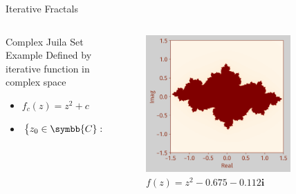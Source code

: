 \documentclass[aspectratio=169,t]{beamer}
\DeclarePairedDelimiter\abs{\lvert}{\rvert} %
\begin{document}
\begin{frame}[label={sec:orgbb74000}]{Iterative Fractals}
\begin{columns}
\begin{column}{0.55\columnwidth}
\begin{block}{Complex Juila Set Example}
Defined by iterative function in complex space

\begin{itemize}
\item \(f_c (z) = z^2 + c\)

\item \(\left\{ z_0 \in \symbb{C}: \abs{f^k_c \left(z_0 \right)} \in \symbb{C} \text{ as } k \to \infty\right\} \in K_c\)
\end{itemize}
\end{block}
\end{column}

\begin{column}{0.45\columnwidth}
\begin{figure}[htbp]
\centering
\includegraphics[width=0.80\textwidth]{./Figs/Fig_2v2.png}
\caption{\(f(z) = z^2 -0.675 - 0.112\symbf{i}\)}
\end{figure}
\end{column}
\end{columns}
\end{frame}
\end{document}
